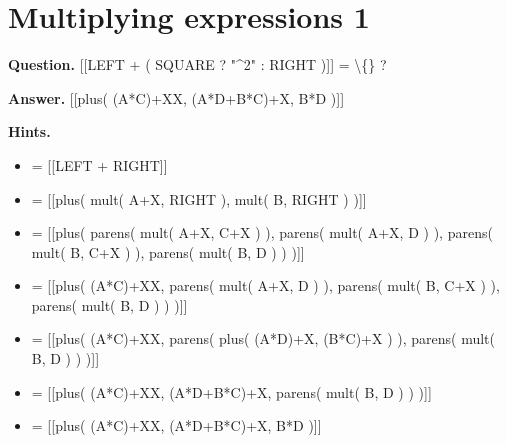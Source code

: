 \documentclass{article}
\begin{document}
\section*{Multiplying expressions 1}
\textbf{Question.} [[LEFT + ( SQUARE ? "\textasciicircum{}2" : RIGHT )]] = \textbackslash\{\} ?

\textbf{Answer.} [[plus( (A*C)+XX, (A*D+B*C)+X, B*D )]]

\textbf{Hints.}
\begin{itemize}
  \item = [[LEFT + RIGHT]]
  \item = [[plus( mult( A+X, RIGHT ), mult( B, RIGHT ) )]]
  \item = [[plus( parens( mult( A+X, C+X ) ), parens( mult( A+X, D ) ), parens( mult( B, C+X ) ), parens( mult( B, D ) ) )]]
  \item = [[plus( (A*C)+XX, parens( mult( A+X, D ) ), parens( mult( B, C+X ) ), parens( mult( B, D ) ) )]]
  \item = [[plus( (A*C)+XX, parens( plus( (A*D)+X, (B*C)+X ) ), parens( mult( B, D ) ) )]]
  \item = [[plus( (A*C)+XX, (A*D+B*C)+X, parens( mult( B, D ) ) )]]
  \item = [[plus( (A*C)+XX, (A*D+B*C)+X, B*D )]]
\end{itemize}
\end{document}
